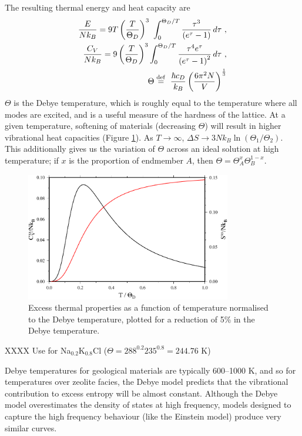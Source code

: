 The resulting thermal energy and heat capacity are
\begin{eqnarray}
\frac{E}{Nk_B} = 9 T \left({T\over \Theta_D}\right)^3\ \int_0^{\Theta_D/T} {\tau^3 \over \left(e^\tau-1\right)}\, d\tau\ ,\\
\frac{C_V}{Nk_B} = 9 \left({T\over \Theta_D}\right)^3\int_0^{\Theta_D/T} {\tau^4 e^\tau\over\left(e^\tau-1\right)^2}\, d\tau\ ,\\
\Theta \stackrel{\mathrm{def}}{=}\  {\hbar c_D \over k_B} \left( {6 \pi^2 N \over V} \right)^{1\over3}
\end{eqnarray}
\noindent $\Theta$ is the Debye temperature, which is roughly equal to the temperature where all modes are excited, and is a useful measure of the hardness of the lattice. At a given temperature, softening of materials (decreasing $\Theta$) will result in higher vibrational heat capacities (Figure \ref{fig:debye_excesses}). As $T \rightarrow \infty$, $\Delta S \rightarrow 3Nk_B\ln (\Theta_{1} / \Theta_{2})$. This additionally gives us the variation of $\Theta$ across an ideal solution at high temperature; if $x$ is the proportion of endmember $A$, then $\Theta = \Theta_A^x \Theta_B^{1-x}$.



\begin{figure}[ht!]
  \centering
  \includegraphics[width=0.8\textwidth]{figures/debye_excesses}
  \caption{Excess thermal properties as a function of temperature normalised to the Debye temperature, plotted for a reduction of 5\% in the Debye temperature.}
  \label{fig:debye_excesses}
\end{figure}

XXXX Use\cite{BD2013} for Na$_{0.2}$K$_{0.8}$Cl ($\Theta = 288^{0.2} 235^{0.8} = 244.76$ K)

Debye temperatures for geological materials are typically 600--1000 K, and so for temperatures over zeolite facies, the Debye model predicts that the vibrational contribution to excess entropy will be almost constant. Although the Debye model overestimates the density of states at high frequency, models designed to capture the high frequency behaviour (like the Einstein model) produce very similar curves. 

